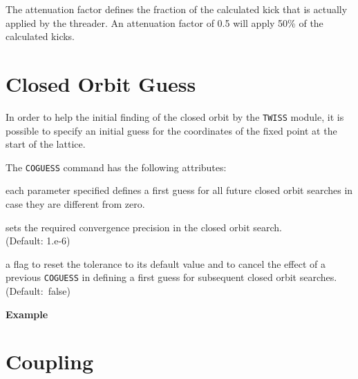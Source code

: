 The attenuation factor defines the fraction of the calculated kick that
is actually applied by the threader.  
An attenuation factor of 0.5 will apply 50\% of the calculated kicks.

\section{Closed Orbit Guess}
\label{sec:coguess}

In order to help the initial finding of the closed orbit by the
\texttt{TWISS} module, it is possible to specify an initial guess for
the coordinates of the fixed point at the start of the lattice.


The \texttt{COGUESS} command has the following attributes:
\begin{madlist}
   each parameter specified defines a first guess for all future closed orbit
  searches in case they are different from zero.  
  
   sets the required convergence precision in the closed
  orbit search. \\ (Default: 1.e-6)  
  
   a flag to reset the tolerance to its default value and to
  cancel the effect of a previous \texttt{COGUESS} in defining a first
  guess for subsequent closed orbit searches. \\ (Default:~false) 

\end{madlist}


\textbf{Example}\\
\section{Coupling}
\label{sec:coupling}

